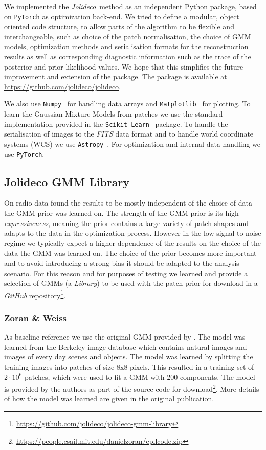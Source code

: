 \documentclass[twocolumn]{aastex631}
\newcommand{\jolideco}{\textit{Jolideco}~}
\begin{document}
    We implemented the \jolideco method as an independent Python package, based on \texttt{PyTorch} as optimization back-end. We tried to define a modular, object oriented code structure, to allow parts of the algorithm to be flexible and interchangeable, such as choice of the patch normalisation, the choice of GMM models, optimization methods and serialisation formats for the reconstruction results as well as corresponding diagnostic information such as the trace of the posterior and prior likelihood values. We hope that this simplifies the future improvement and extension of the package. The package is available at \url{https://github.com/jolideco/jolideco}.

    We also use \texttt{Numpy}~\citep{Numpy2020} for handling data arrays and \texttt{Matplotlib}~\citep{Hunter2007} for plotting. To learn the Gaussian Mixture Models from patches we use the standard implementation provided in the \texttt{Scikit-Learn}~\citep{Skimage2014} package. To handle the serialisation of images to the \textit{FITS} data format and to handle world coordinate systems (WCS) we use \texttt{Astropy}~\citep{Astropy2018}. For optimization and internal data handling we use \texttt{PyTorch}.

    \subsection{Jolideco GMM Library}
    \label{ssec:jolideco-gmm-library}
    On radio data \cite{Bouman2016} found the results to be mostly independent of the choice of data the GMM prior was learned on. The strength of the GMM prior is its high \textit{expressiveness}, meaning the prior contains a large variety of patch shapes and adapts to the data in the optimization process. However in the low signal-to-noise regime we typically expect a higher dependence of the results on the choice of the data the GMM was learned on. The choice of the prior becomes more important and to avoid introducing a strong bias it should be adapted to the analysis scenario. For this reason and for purposes of testing we learned and provide a selection of GMMs (a \textit{Library}) to be used with the patch prior for download in a \textit{GitHub} repository\footnote{\url{https://github.com/jolideco/jolideco-gmm-library}}.
    
    \subsubsection{Zoran \& Weiss}
    As baseline reference we use the original GMM provided by \cite{Zoran2011}. The model was learned from the Berkeley image database \citep{Martin2001} which contains natural images and images of every day scenes and objects. The model was learned by splitting the training images into patches of size 8x8 pixels. This resulted in a training set of $2 \cdot 10^{6}$ patches, which were used to fit a GMM with 200 components. The model is provided by the authors as part of the source code for download\footnote{\url{https://people.csail.mit.edu/danielzoran/epllcode.zip}}. More details of how the model was learned are given in the original publication.
    
\end{document}
